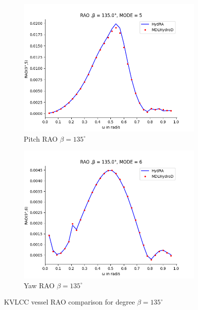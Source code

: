 \begin{figure}[H]
\begin{subfigure}[b]{0.45\textwidth}
        \includegraphics[width=\textwidth]{plots/kcs/rao2/rao5.png}
        \caption{Pitch RAO $\beta = 135^{\circ}$}
    \end{subfigure}
    \begin{subfigure}[b]{0.45\textwidth}
        \includegraphics[width=\textwidth]{plots/kcs/rao2/rao6.png}
        \caption{Yaw RAO $\beta = 135^{\circ}$}
    \end{subfigure}
    \caption{KVLCC vessel RAO comparison for degree $\beta= 135^{\circ}$}
    \label{fig:kvlcc_rao_135}
\end{figure}